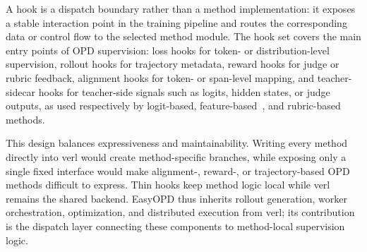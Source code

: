 A hook is a dispatch boundary rather than a method implementation: it exposes a stable interaction point in the training pipeline and routes the corresponding data or control flow to the selected method module. The hook set covers the main entry points of OPD supervision: loss hooks for token- or distribution-level supervision, rollout hooks for trajectory metadata, reward hooks for judge or rubric feedback, alignment hooks for token- or span-level mapping, and teacher-sidecar hooks for teacher-side signals such as logits, hidden states, or judge outputs, as used respectively by logit-based, feature-based~\citep{zhang2024dskd}, and rubric-based methods.

This design balances expressiveness and maintainability. Writing every method directly into verl would create method-specific branches, while exposing only a single fixed interface would make alignment-, reward-, or trajectory-based OPD methods difficult to express. Thin hooks keep method logic local while verl remains the shared backend. EasyOPD thus inherits rollout generation, worker orchestration, optimization, and distributed execution from verl; its contribution is the dispatch layer connecting these components to method-local supervision logic.
